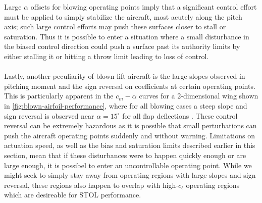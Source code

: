 Large $\alpha$ offsets for blowing operating points imply that a significant control effort must be applied to simply stabilize the aircraft, most acutely along the pitch axis; such large control efforts may push these surfaces closer to stall or saturation. 
Thus it is possible to enter a situation where a small disturbance in the biased control direction could push a surface past its authority limits by either stalling it or hitting a throw limit leading to loss of control. \\
\\
Lastly, another peculiarity of blown lift aircraft is the large slopes observed in pitching moment and the sign reversal on coefficients at certain operating points. 
This is particularly apparent in the $c_m-\alpha$ curves for a 2-dimensional wing shown in \cref{fig:blown-airfoil-performance}, where for all blowing cases a steep slope and sign reversal is observed near $\alpha = 15^\circ$ for all flap deflections \cite{long_parametric_2021}. 
These control reversal can be extremely hazardous as it is possible that small perturbations can push the aircraft operating points suddenly and without warning. 
Limitations on actuation speed, as well as the bias and saturation limits described earlier in this section, mean that if these disturbances were to happen quickly enough or are large enough, it is possibel to enter an uncontrollable operating point. 
While we might seek to simply stay away from operating regions with large slopes and sign reversal, these regions also happen to overlap with high-$c_\ell$ operating regions which are desireable for STOL performance.\\
\\

